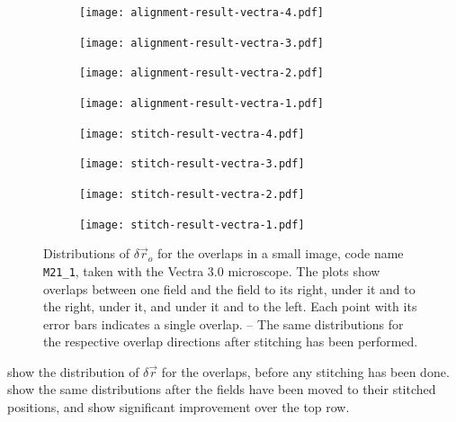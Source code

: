 \documentclass{article}
\newcommand{\M}[2]{\texttt{M#1\_#2}}
\begin{document}
\begin{figure}[ht]
	\centering
	\begin{subfigure}{0.24\linewidth}
		\texttt{[image: alignment-result-vectra-4.pdf]}
		\caption{}
		\label{fig:alignmentresult4}
	\end{subfigure}
	\begin{subfigure}{0.24\linewidth}
		\texttt{[image: alignment-result-vectra-3.pdf]}
		\caption{}
		\label{fig:alignmentresult3}
	\end{subfigure}
	\begin{subfigure}{0.24\linewidth}
		\texttt{[image: alignment-result-vectra-2.pdf]}
		\caption{}
		\label{fig:alignmentresult2}
	\end{subfigure}
	\begin{subfigure}{0.24\linewidth}
		\texttt{[image: alignment-result-vectra-1.pdf]}
		\caption{}
		\label{fig:alignmentresult1}
	\end{subfigure}
	\begin{subfigure}{0.24\linewidth}
		\texttt{[image: stitch-result-vectra-4.pdf]}
		\caption{}
		\label{fig:stitchresult4}
	\end{subfigure}
	\begin{subfigure}{0.24\linewidth}
		\texttt{[image: stitch-result-vectra-3.pdf]}
		\caption{}
		\label{fig:stitchresult3}
	\end{subfigure}
	\begin{subfigure}{0.24\linewidth}
		\texttt{[image: stitch-result-vectra-2.pdf]}
		\caption{}
		\label{fig:stitchresult2}
	\end{subfigure}
	\begin{subfigure}{0.24\linewidth}
		\texttt{[image: stitch-result-vectra-1.pdf]}
		\caption{}
		\label{fig:stitchresult1}
	\end{subfigure}
	\caption{Distributions of $\delta\vec{r}_o$ for the overlaps in a small image, code name \M{21}1, taken with the Vectra 3.0 microscope.  The plots show overlaps between one field and the field  to its right,  under it and to the right,  under it, and  under it and to the left.  Each point with its error bars indicates a single overlap.  -- The same distributions for the respective overlap directions after stitching has been performed.}
	\label{fig:alignmentresults}
\end{figure}

 show the distribution of $\delta\vec{r}$ for the overlaps, before any stitching has been done.   show the same distributions after the fields have been moved to their stitched positions, and show significant improvement over the top row.
\end{document}
